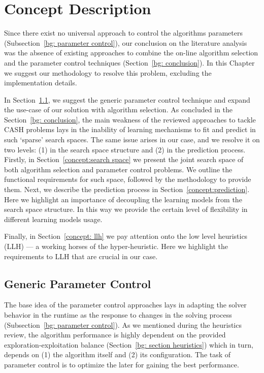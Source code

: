 \chapter{Concept Description}


Since there exist no universal approach to control the algorithms parameters (Subsection~\ref{bg: parameter control}), our conclusion on the literature analysis was the absence of existing approaches to combine the on-line algorithm selection and the parameter control techniques (Section~\ref{bg: conclusion}). In this Chapter we suggest our methodology to resolve this problem, excluding the implementation details.

In Section~\ref{concept:parameter control}, we suggest the generic parameter control technique and expand the use-case of our solution with algorithm selection. As concluded in the Section~\ref{bg: conclusion}, the main weakness of the reviewed approaches to tackle CASH problems lays in the inability of learning mechanisms to fit and predict in such `sparse' search spaces. The same issue arises in our case, and we resolve it on two levels: (1) in the search space structure and (2) in the prediction process. Firstly, in Section~\ref{concept:search space} we present the joint search space of both algorithm selection and parameter control problems. We outline the functional requirements for such space, followed by the methodology to provide them. Next, we describe the prediction process in Section~\ref{concept:prediction}. Here we highlight an importance of decoupling the learning models from the search space structure. In this way we provide the certain level of flexibility in different learning models usage.

Finally, in Section~\ref{concept: llh} we pay attention onto the low level heuristics (LLH) — a working horses of the hyper-heuristic. Here we highlight the requirements to LLH that are crucial in our case.


\section{Generic Parameter Control}\label{concept:parameter control}
The base idea of the parameter control approaches lays in adapting the solver behavior in the runtime as the response to changes in the solving process (Subsection~\ref{bg: parameter control}). As we mentioned during the heuristics review, the algorithm performance is highly dependent on the provided exploration-exploitation balance (Section~\ref{bg: section heuristics}) which in turn, depends on (1) the algorithm itself and (2) its configuration. The task of parameter control is to optimize the later for gaining the best performance. 

